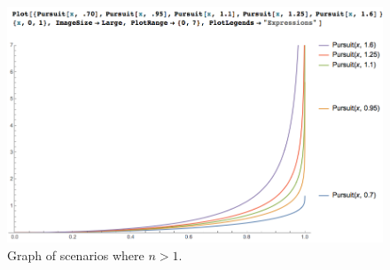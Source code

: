 \documentclass[11pt]{report}
\begin{document}
\begin{figure}
\includegraphics[width=\linewidth]{pursuitgraphs2}
\caption{Graph of scenarios where $n>1$.}
\label{fig:pursuitgraphs2}
\end{figure}
\end{document}
